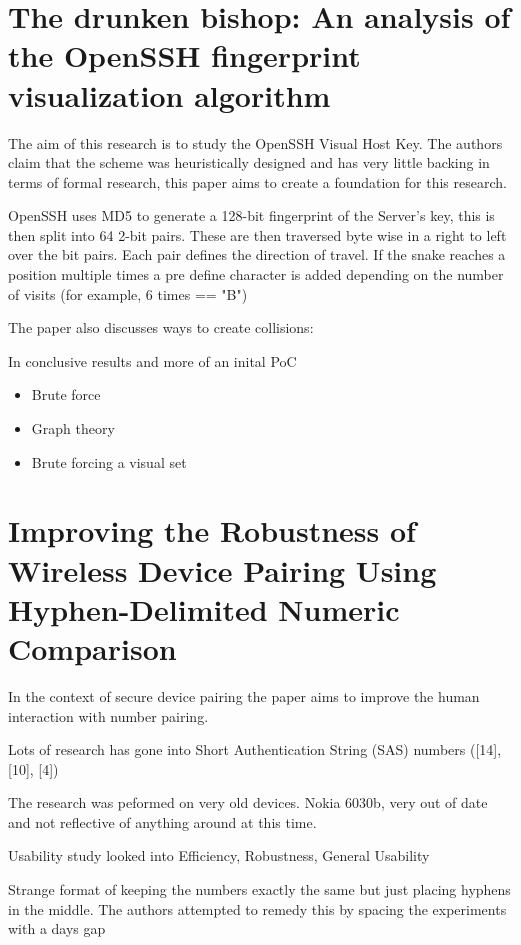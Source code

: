 \newpage

\section{The drunken bishop: An analysis of the OpenSSH
fingerprint visualization algorithm}

The aim of this research is to study the OpenSSH Visual Host Key. The authors claim that the scheme was heuristically designed and has very little backing in terms of formal research, this paper aims to create a foundation for this research.

OpenSSH uses MD5 to generate a 128-bit fingerprint of the Server's key, this is then split into 64 2-bit pairs. These are then traversed byte wise in a right to left over the bit pairs. Each pair defines the direction of travel. If the snake reaches a position multiple times a pre define character is added depending on the number of visits (for example, 6 times == "B")

The paper also discusses ways to create collisions:

In conclusive results and more of an inital PoC

\begin{itemize}
    \item Brute force
    \item Graph theory
    \item Brute forcing a visual set
\end{itemize}

\newpage

\section{Improving the Robustness of Wireless Device
Pairing Using Hyphen-Delimited Numeric
Comparison}

In the context of secure device pairing the paper aims to improve the human interaction with number pairing.

Lots of research has gone into Short Authentication String (SAS) numbers ([14], [10], [4])

The research was peformed on very old devices. Nokia 6030b, very out of date and not reflective of anything around at this time.

Usability study looked into Efficiency, Robustness, General Usability

Strange format of keeping the numbers exactly the same but just placing hyphens in the middle. The authors attempted to remedy this by spacing the experiments with a days gap

